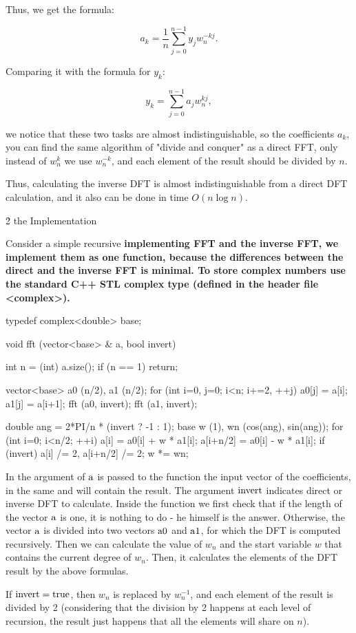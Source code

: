Thus, we get the formula:

$$ a_k = \frac{1}{n} \sum_{j=0}^{n-1} y_j w_n^{-kj}. $$

Comparing it with the formula for $y_k$:

$$ y_k = \sum_{j=0}^{n-1} a_j w_n^{kj}, $$

we notice that these two tasks are almost indistinguishable, so the coefficients $a_k$, you can find the same algorithm of "divide and conquer" as a direct FFT, only instead of $w_n^k$ we use $w_n^{-k}$, and each element of the result should be divided by $n$.

Thus, calculating the inverse DFT is almost indistinguishable from a direct DFT calculation, and it also can be done in time $O(n \log n)$.


\h2{ the Implementation }

Consider a simple recursive \bf{implementing FFT} and the inverse FFT, we implement them as one function, because the differences between the direct and the inverse FFT is minimal. To store complex numbers use the standard C++ STL complex type (defined in the header file <complex>).

\code
typedef complex<double> base;

void fft (vector<base> & a, bool invert) {
int n = (int) a.size();
if (n == 1) return;

vector<base> a0 (n/2), a1 (n/2);
for (int i=0, j=0; i<n; i+=2, ++j) {
a0[j] = a[i];
a1[j] = a[i+1];
}
fft (a0, invert);
fft (a1, invert);

double ang = 2*PI/n * (invert ? -1 : 1);
base w (1), wn (cos(ang), sin(ang));
for (int i=0; i<n/2; ++i) {
a[i] = a0[i] + w * a1[i];
a[i+n/2] = a0[i] - w * a1[i];
if (invert)
a[i] /= 2, a[i+n/2] /= 2;
w *= wn;
}
}
\endcode

In the argument of $\rm a$ is passed to the function the input vector of the coefficients, in the same and will contain the result. The argument $\rm invert$ indicates direct or inverse DFT to calculate. Inside the function we first check that if the length of the vector $\rm a$ is one, it is nothing to do - he himself is the answer. Otherwise, the vector $\rm a$ is divided into two vectors $\rm a0$ and $\rm a1$, for which the DFT is computed recursively. Then we can calculate the value of $w_n$ and the start variable $w$ that contains the current degree of $w_n$. Then, it calculates the elements of the DFT result by the above formulas.

If $\rm invert = true$, then $w_n$ is replaced by $w_n^{-1}$, and each element of the result is divided by 2 (considering that the division by 2 happens at each level of recursion, the result just happens that all the elements will share on $n$).

